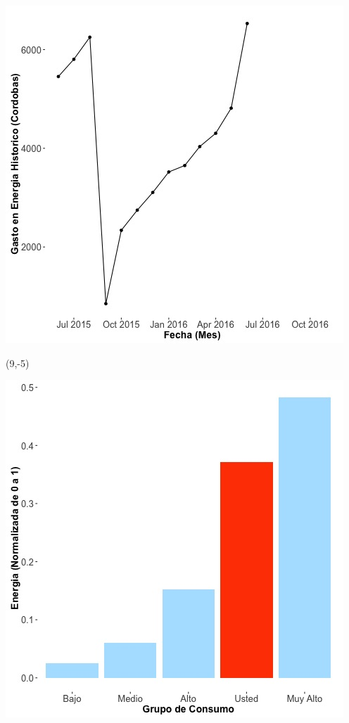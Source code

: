 \documentclass{article}\usepackage[]{graphicx}\usepackage[]{color}
\newenvironment{knitrout}{}{} %
\begin{document}
\begin{knitrout}
\color{fgcolor}
\includegraphics[scale=0.65]{figure/A29_historico_cordobas} 
\end{knitrout}

 \begin{textblock}{1}(9,-5)
\begin{minipage}{20em}
\begingroup

\endgroup
\end{minipage}
\end{textblock}


\begin{knitrout}
\color{fgcolor}
\includegraphics[scale=0.65]{figure/A29_neighbor_plot} 
\end{knitrout}
\end{document}
